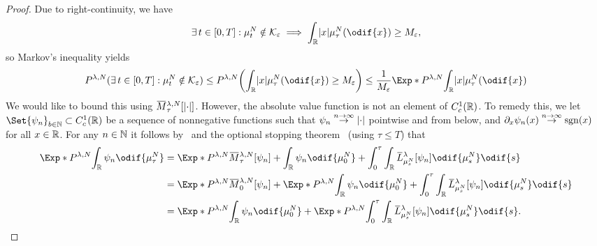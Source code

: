 \begin{proof}
  Due to right-continuity, we have
  \begin{equation}
    \exists t \in [0,T] : \mu_t^N \notin \cK_\eps \implies \int_\potspace \abs{x} \mu_\tau^N(\odif{x}) \geq M_\eps,
  \end{equation}
  so Markov's inequality yields
  \begin{equation}\label{eq:ccc:markov-res}
    P^{\lambda, N} (\exists t \in [0,T] : \mu_t^N \notin \cK_\eps)
    \leq P^{\lambda, N} \br*{ \int_\potspace \abs{x} \mu_\tau^N(\odif{x}) \geq M_\eps }
    \leq \frac{1}{M_\eps} \Exp*{P^{\lambda, N}}{\int_\potspace \abs{x} \mu_\tau^N(\odif{x})}
  \end{equation}
  We would like to bound this using \( \ol{M}_\tau^{\lambda, N}[\abs{\cdot}] \).
  However, the absolute value function is not an element of \( C_c^1(\mathbb{R}) \).
  To remedy this, we let \( \Set{\psi_n}_{b\in\bN} \subset C_c^1(\potspace)\) be a sequence of nonnegative functions such that \( \psi_n \overset{n\to\infty}{\to} \lvert\cdot\rvert \) pointwise and from below, and \( \partial_x \psi_n(x) \overset{n\to\infty}{\to} \operatorname{sgn}(x) \) for all \( x \in \mathbb{R} \).
  For any \( n \in \mathbb{N} \) it follows by~ and the optional stopping theorem~\cite[Theorem 7.15]{klebanerIntroductionStochasticCalculus2012} (using \( \tau \leq T \)) that
  \begin{equation}\label{eq:ccc:mart-usage}
    \begin{split}
    \Exp*{P^{\lambda, N}}{\int_\potspace \psi_n \odif{\mu_\tau^N}}
    &= \Exp*{P^{\lambda, N}}{\ol{M}_\tau^{\lambda, N}[\psi_n] + \int_\potspace \psi_n \odif{\mu_0^N} + \int_0^\tau \int_\potspace \ol{L}_{\mu_{s}^N}^{\lambda} [\psi_n] \odif{\mu_{s}^N} \odif{s} } \\
    &= \Exp*{P^{\lambda, N}}{\ol{M}_0^{\lambda, N}[\psi_n]} + \Exp*{P^{\lambda, N}}{\int_\potspace \psi_n \odif{\mu_0^N} + \int_0^\tau \int_\potspace \ol{L}_{\mu_{s}^N}^{\lambda} [\psi_n] \odif{\mu_{s}^N} \odif{s} } \\
    &= \Exp*{P^{\lambda, N}}{\int_\potspace \psi_n \odif{\mu_0^N}} + \Exp*{P^{\lambda, N}}{\int_0^\tau \int_\potspace \ol{L}_{\mu_{s}^N}^{\lambda} [\psi_n] \odif{\mu_{s}^N} \odif{s} }.

\end{split}
\end{equation}
\end{proof}
